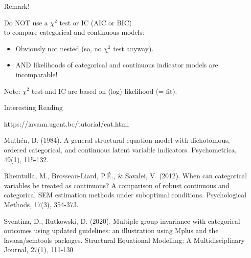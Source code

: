 \documentclass[10pt]{beamer}\usepackage[]{graphicx}\usepackage[]{xcolor}
\begin{document}
\begin{frame}{Remark!}
	
Do NOT use a $\chi^2$ test or IC (AIC or BIC) \\
to compare categorical and continuous models:

\vspace{5mm}

\begin{itemize}
	\item Obviously not nested (so, no $\chi^2$ test anyway).
	\item AND likelihoods of categorical and continuous indicator models are incomparable!
\end{itemize}
	
	\vspace{5mm}
	
	Note: $\chi^2$ test and IC are based on (log) likelihood (= fit).
	
\end{frame}


%	
%	
%


\begin{frame}{Interesting Reading}
	
	https://lavaan.ugent.be/tutorial/cat.html
	
	\vspace{5mm}
	
	Muthén, B. (1984). A general structural equation model with dichotomous, ordered categorical, and continuous latent variable indicators. Psychometrica, 49(1), 115-132.
	
	\vspace{5mm}
	
	Rhemtulla, M., Brosseau-Liard, P.É., \& Savalei, V. (2012). When can categorical variables be treated as continuous? A comparison of robust continuous and categorical SEM estimation methods under suboptimal conditions. Psychological Methods, 17(3), 354-373. 
	
	\vspace{5mm}
	
	Sventina, D., Rutkowski, D. (2020). Multiple group invariance with categorical outcomes using updated guidelines: an illustration using Mplus and the lavaan/semtools packages. Structural Equational Modelling: A Multidisciplinary Journal, 27(1), 111-130

\end{frame}
%
%
\end{document}
